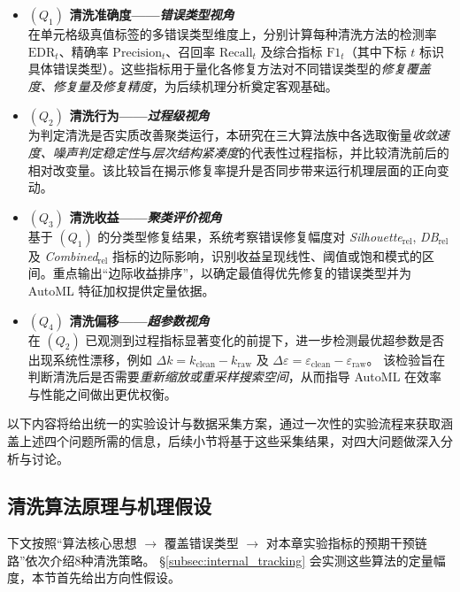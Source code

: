 \documentclass[10pt]{article} %
\numberwithin{equation}{section}
\begin{document}
\begin{itemize}
    \item \textbf{\((Q_1)\) 清洗准确度——\emph{错误类型视角}}\\
          \textcolor[rgb]{0.00,0.07,1.00}{在单元格级真值标签的多错误类型维度上，分别计算每种清洗方法的检测率 \(\mathrm{EDR}_t\)、精确率 \(\mathrm{Precision}_t\)、召回率 \(\mathrm{Recall}_t\) 及综合指标 \(\mathrm{F1}_t\)（其中下标 \(t\) 标识具体错误类型）。这些指标用于量化各修复方法对不同错误类型的\emph{修复覆盖度、修复量及修复精度}，为后续机理分析奠定客观基础。}

    \item \textbf{\((Q_2)\) 清洗行为——\emph{过程级视角}}\\
          \textcolor[rgb]{0.00,0.07,1.00}{为判定清洗是否实质改善聚类运行，本研究在三大算法族中各选取衡量\emph{收敛速度、噪声判定稳定性}与\emph{层次结构紧凑度}的代表性过程指标，并比较清洗前后的相对改变量。该比较旨在揭示修复率提升是否同步带来运行机理层面的正向变动。}

    \item \textbf{\((Q_3)\) 清洗收益——\emph{聚类评价视角}}\\
          \textcolor[rgb]{0.00,0.07,1.00}{基于 \((Q_1)\) 的分类型修复结果，系统考察错误修复幅度对 \emph{Silhouette\(_{\mathrm{rel}}\)}, \emph{DB\(_{\mathrm{rel}}\)} 及 \emph{Combined\(_{\mathrm{rel}}\)} 指标的边际影响，识别收益呈现线性、阈值或饱和模式的区间。重点输出“边际收益排序”，以确定最值得优先修复的错误类型并为 AutoML 特征加权提供定量依据。}

    \item \textbf{\((Q_4)\) 清洗偏移——\emph{超参数视角}}\\
          \textcolor[rgb]{0.00,0.07,1.00}{在 \((Q_2)\) 已观测到过程指标显著变化的前提下，进一步检测最优超参数是否出现系统性漂移，例如  
          \(\Delta k = k_{\mathrm{clean}} - k_{\mathrm{raw}}\) 及  
          \(\Delta\varepsilon = \varepsilon_{\mathrm{clean}} - \varepsilon_{\mathrm{raw}}\)。  
          该检验旨在判断清洗后是否需要\emph{重新缩放或重采样搜索空间}，从而指导 AutoML 在效率与性能之间做出更优权衡。}
\end{itemize}

\noindent
以下内容将给出统一的实验设计与数据采集方案，通过一次性的实验流程来获取涵盖上述四个问题所需的信息，后续小节将基于这些采集结果，对四大问题做深入分析与讨论。

\subsection{清洗算法原理与机理假设}
\label{sec:clean-principle}
下文按照“算法核心思想 $\rightarrow$ 覆盖错误类型
$\rightarrow$ 对本章实验指标的预期干预链路”依次介绍8种清洗策略。
\S\ref{subsec:internal_tracking} 会实测这些算法的定量幅度，本节首先给出方向性假设。
\end{document}
